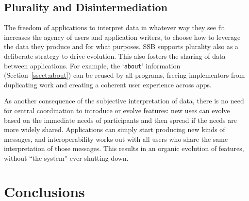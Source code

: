 \documentclass[9pt,sigconf]{acmart}
\begin{document}
\subsection{Plurality and Disintermediation}


The freedom of applications to interpret data in whatever way they see fit increases the agency of users and application writers, to choose how to leverage the data they produce and for what purposes. SSB supports plurality also as a deliberate strategy to drive evolution. This also fosters the sharing of data between applications. For example, the `{\small\tt about}' information (Section~\ref{ssect:about}) can be reused by all programs, freeing implementors from duplicating work and creating a coherent user experience across apps.

As another consequence of the subjective interpretation of data, there is no need for central coordination to introduce or evolve features: new uses can evolve based on the immediate needs of participants and then spread if the needs are more widely shared. Applications can simply start producing new kinds of messages, and interoperability works out with all users who share the same interpretation of those messages.  This results in an organic evolution of features, without ``the system'' ever shutting down.



\section{Conclusions}
\end{document}
